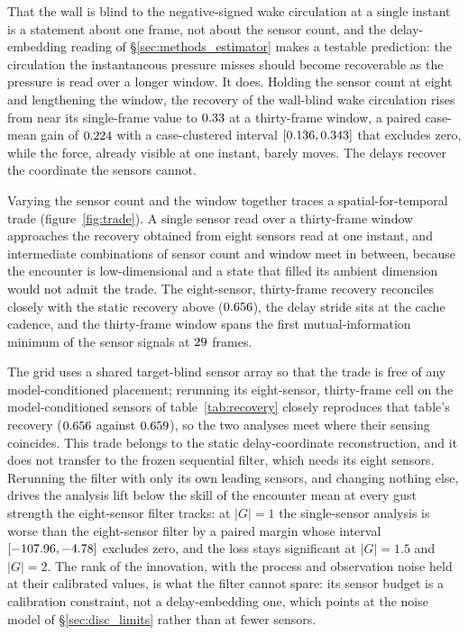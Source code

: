 That the wall is blind to the negative-signed wake circulation at a single instant is a statement about one frame, not about the sensor count, and the delay-embedding reading of \S\ref{sec:methods_estimator} makes a testable prediction: the circulation the instantaneous pressure misses should become recoverable as the pressure is read over a longer window. It does. Holding the sensor count at eight and lengthening the window, the recovery of the wall-blind wake circulation rises from near its single-frame value to $0.33$ at a thirty-frame window, a paired case-mean gain of $0.224$ with a case-clustered interval $[0.136, 0.343]$ that excludes zero, while the force, already visible at one instant, barely moves. The delays recover the coordinate the sensors cannot.\re

Varying the sensor count and the window together traces a spatial-for-temporal trade (figure~\ref{fig:trade}). A single sensor read over a thirty-frame window approaches the recovery obtained from eight sensors read at one instant, and intermediate combinations of sensor count and window meet in between, because the encounter is low-dimensional and a state that filled its ambient dimension would not admit the trade. The eight-sensor, thirty-frame recovery reconciles closely with the static recovery above ($0.656$), the delay stride sits at the cache cadence, and the thirty-frame window spans the first mutual-information minimum of the sensor signals at $29$ frames.\re

The grid uses a shared target-blind sensor array so that the trade is free of any model-conditioned placement; rerunning its eight-sensor, thirty-frame cell on the model-conditioned sensors of table~\ref{tab:recovery} closely reproduces that table's recovery ($0.656$ against $0.659$), so the two analyses meet where their sensing coincides. This trade belongs to the static delay-coordinate reconstruction, and it does not transfer to the frozen sequential filter, which needs its eight sensors. Rerunning the filter with only its own leading sensors, and changing nothing else, drives the analysis lift below the skill of the encounter mean at every gust strength the eight-sensor filter tracks: at $|G| = 1$ the single-sensor analysis is worse than the eight-sensor filter by a paired margin whose interval $[-107.96, -4.78]$ excludes zero, and the loss stays significant at $|G| = 1.5$ and $|G| = 2$. The rank of the innovation, with the process and observation noise held at their calibrated values, is what the filter cannot spare: its sensor budget is a calibration constraint, not a delay-embedding one, which points at the noise model of \S\ref{sec:disc_limits} rather than at fewer sensors.\re

